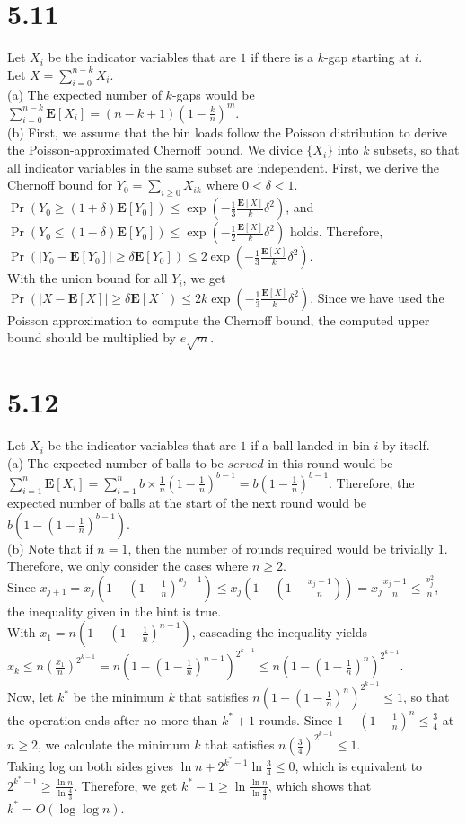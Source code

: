 \documentclass{article}
\begin{document}
\section*{5.11}
Let $X_i$ be the indicator variables that are $1$ if there is a $k$-gap starting at $i$.\\
Let $X=\sum\limits_{i=0}^{n-k}X_i$.\\
(a) The expected number of $k$-gaps would be $\sum\limits_{i=0}^{n-k}\textbf{E}[X_i]=(n-k+1)(1-\frac{k}{n})^m$.\\
(b) First, we assume that the bin loads follow the Poisson distribution to derive the Poisson-approximated Chernoff bound.
We divide $\{X_i\}$ into $k$ subsets, so that all indicator variables in the same subset are independent.
First, we derive the Chernoff bound for $Y_0=\sum\limits_{i\geq0}X_{ik}$ where $0<\delta<1$.\\
$\Pr(Y_0\geq(1+\delta)\textbf{E}[Y_0])\leq\exp(-\frac{1}{3}\frac{\textbf{E}[X]}{k}\delta^2)$, and
$\Pr(Y_0\leq(1-\delta)\textbf{E}[Y_0])\leq\exp(-\frac{1}{2}\frac{\textbf{E}[X]}{k}\delta^2)$ holds.
Therefore, $\Pr(|Y_0-\textbf{E}[Y_0]|\geq\delta\textbf{E}[Y_0])\leq2\exp(-\frac{1}{3}\frac{\textbf{E}[X]}{k}\delta^2)$.\\
With the union bound for all $Y_i$, we get $\Pr(|X-\textbf{E}[X]|\geq\delta\textbf{E}[X])\leq2k\exp(-\frac{1}{3}\frac{\textbf{E}[X]}{k}\delta^2)$.
Since we have used the Poisson approximation to compute the Chernoff bound, the computed upper bound should be multiplied by $e\sqrt{m}$.
\section*{5.12}
Let $X_i$ be the indicator variables that are $1$ if a ball landed in bin $i$ by itself.\\
(a) The expected number of balls to be $\textit{served}$ in this round would be
$\sum\limits_{i=1}^n\textbf{E}[X_i]=\sum\limits_{i=1}^nb\times\frac{1}{n}(1-\frac{1}{n})^{b-1}=b(1-\frac{1}{n})^{b-1}$.
Therefore, the expected number of balls at the start of the next round would be $b(1-(1-\frac{1}{n})^{b-1})$.\\
(b) Note that if $n=1$, then the number of rounds required would be trivially $1$. Therefore, we only consider the cases where $n\geq 2$.\\
Since $x_{j+1}=x_j(1-(1-\frac{1}{n})^{x_j-1})\leq x_j(1-(1-\frac{x_j-1}{n}))=x_j\frac{x_j-1}{n}\leq \frac{x_j^2}{n}$, the inequality given in the hint is true.\\
With $x_1=n(1-(1-\frac{1}{n})^{n-1})$, cascading the inequality yields $x_k\leq n(\frac{x_1}{n})^{2^{k-1}}=n(1-(1-\frac{1}{n})^{n-1})^{2^{k-1}}\leq n(1-(1-\frac{1}{n})^n)^{2^{k-1}}$.\\
Now, let $k^*$ be the minimum $k$ that satisfies $n(1-(1-\frac{1}{n})^n)^{2^{k-1}}\leq 1$, so that the operation ends after no more than $k^*+1$ rounds.
Since $1-(1-\frac{1}{n})^n \leq \frac{3}{4}$ at $n\geq 2$, we calculate the minimum $k$ that satisfies $n(\frac{3}{4})^{2^{k-1}}\leq 1$.\\
Taking log on both sides gives $\ln n +2^{k^*-1} \ln\frac{3}{4}\leq 0$, which is equivalent to $2^{k^*-1}\geq \frac{\ln n}{\ln \frac{4}{3}}$.
Therefore, we get $k^*-1\geq \ln \frac{\ln n}{\ln \frac{4}{3}}$, which shows that $k^*=O(\log\log n)$.
\end{document}
